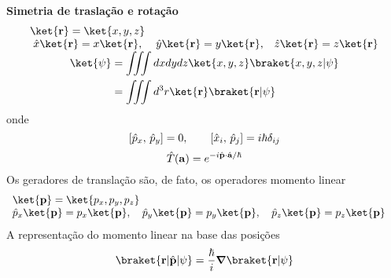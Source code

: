 \documentclass[12pt,brazil,table]{beamer}
\begin{document}
\begin{frame}
\begin{columns}[T]
  \textbf{Simetria de traslação e rotação}\\ \vspace*{-0.75cm}
  \[
    \begin{array}{ccc}
    \ket{\mathbf{r}} = \ket{x,y,z}&&\\
    \hat{x}\ket{\mathbf{r}} = x\ket{\mathbf{r}},& \hat{y}\ket{\mathbf{r}} = y\ket{\mathbf{r}},& \hat{z}\ket{\mathbf{r}} = z\ket{\mathbf{r}}\vspace*{-0.25cm}
    \end{array}    
  \]
  \[
    \begin{align*}
      \ket{\psi} &= \iiint dxdydz \ket{x,y,z}\braket{x,y,z|\psi}\\
      &= \iiint d^3r \ket{\mathbf{r}}\braket{\mathbf{r}|\psi}
    \end{align*}\vspace*{-0.25cm}
  \]
  onde\vspace*{-0.25cm}
  \[
    \left[\hat{p}_x,\, \hat{p}_y\right]=0,\qquad \left[\hat{x}_i,\,\hat{p}_j\right]=i\hbar\delta_{ij}\vspace*{-0.25cm}
  \]
  \[
    \hat{T}(\mathbf{a}) = e^{-i\hat{\mathbf{p}}\cdot \hat{\mathbf{a}}/\hbar}\vspace*{-0.25cm}
  \]
  Os geradores de translação são, de fato, os operadores momento linear\vspace*{-0.25cm}
  \[
    \begin{array}{ll}
    \ket{\mathbf{p}} = \ket{p_x,p_y,p_z}&\\
    \hat{p}_x\ket{\mathbf{p}} = p_x\ket{\mathbf{p}},\quad \hat{p}_y\ket{\mathbf{p}} = p_y\ket{\mathbf{p}},\quad \hat{p}_z\ket{\mathbf{p}} = p_z\ket{\mathbf{p}}&
    \end{array}\vspace*{-0.25cm}
  \]
  A representação do momento linear na base das posições\vspace*{-0.25cm}
  \[
    \braket{\mathbf{r}|\hat{\mathbf{p}}|\psi} = \dfrac{\hbar}{i}\boldsymbol{\nabla}\braket{\mathbf{r}|\psi}
  \]  
  \end{columns}

\end{frame}



\end{document}
